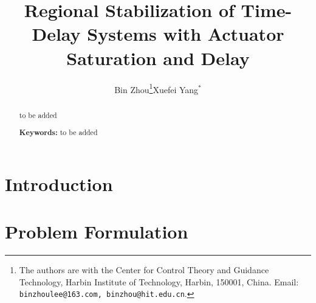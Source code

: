\documentclass[9pt]{article}%
\begin{document}
\title{Regional Stabilization of Time-Delay Systems with Actuator Saturation and
Delay }
\author{Bin Zhou\thanks{The authors are with the Center for Control Theory and
Guidance Technology, Harbin Institute of Technology, Harbin, 150001, China.
Email: \texttt{binzhoulee@163.com, binzhou@hit.edu.cn}.}\quad \quad Xuefei
Yang$^{\ast}$}
\date{}
\maketitle

\begin{abstract}
to be added

\vspace{0.3cm}

\textbf{Keywords:} to be added

\end{abstract}

\section{Introduction}

\section{Problem Formulation}
\end{document}
